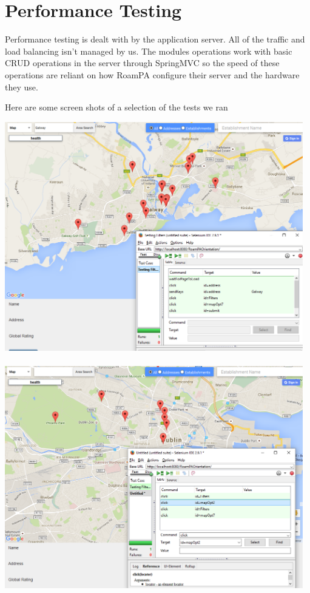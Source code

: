 \section{Performance Testing}

Performance testing is dealt with by the application server. All of the traffic and load balancing isn't managed by us. The modules operations work with basic CRUD operations in the server through SpringMVC so the speed of these operations are reliant on how RoamPA configure their server and the hardware they use. \newline \newline 

\noindent Here are some screen shots of a selection of the tests we ran

\begin{center}    
	\includegraphics[height=10cm, width=13cm]{img/seleniumtest.png}
\end{center}

\begin{center}    
	\includegraphics[height=10cm, width=13cm]{img/seleniumtestfilters.png}
\end{center}

